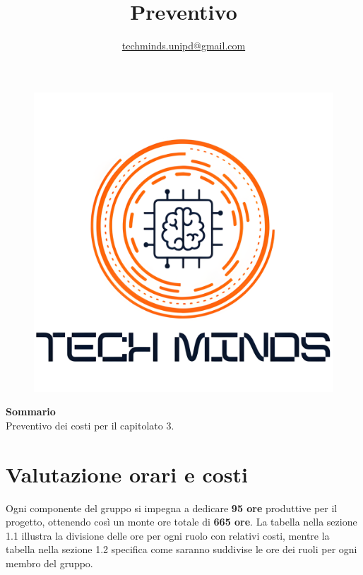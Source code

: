 \documentclass[10pt]{article}
\title{\textbf{Preventivo}}
\author{\href{mailto:techminds.unipd@gmail.com}{techminds.unipd@gmail.com}}
\date{}
\begin{document}
\begin{figure}
    \centering
    \includegraphics[width=0.8\linewidth]{../../../assets/logo_upscaled.png}
\end{figure}
\maketitle
\begin{center}

  \textbf{Sommario}\\
  \vspace{3mm}
  Preventivo dei costi per il capitolato 3.
\end{center}
\newpage
\tableofcontents{\newpage}

\section{Valutazione orari e costi}
Ogni componente del gruppo si impegna a dedicare \textbf{95 ore} produttive per il progetto, ottenendo così un monte ore totale di \textbf{665 ore}. La tabella nella sezione 1.1 illustra la divisione delle ore per ogni ruolo con relativi costi, mentre la tabella nella sezione 1.2 specifica come saranno suddivise le ore dei ruoli per ogni membro del gruppo.
\end{document}
